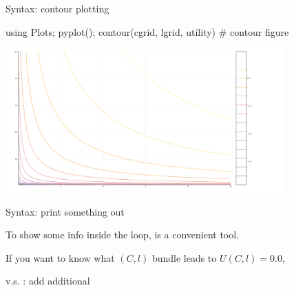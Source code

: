 \documentclass[11pt,aspectratio=43,usenames,dvipsnames]{beamer}
\theoremstyle{definition}
\begin{document}
\begin{frame}[fragile]{Syntax: contour plotting}
\label{slide:Syntax__contour_plotting}

\begin{juliacode}
    using Plots; pyplot();
    contour(cgrid, lgrid, utility)  # contour figure
\end{juliacode}

\includegraphics[width=0.8\textwidth]{./figures/utility_contour.png}

\end{frame}

\begin{frame}[fragile]{Syntax:  print something out}
\label{slide:Syntax___mintinline_julia__println__print_something_out}

To show some info inside the  loop,  is a convenient tool.

If you want to know what $ (C, l) $ bundle leads to $ U(C, l) = 0.0 $,

 v.s. :  add additional \juliainline{\n}
\end{frame}
\end{document}
